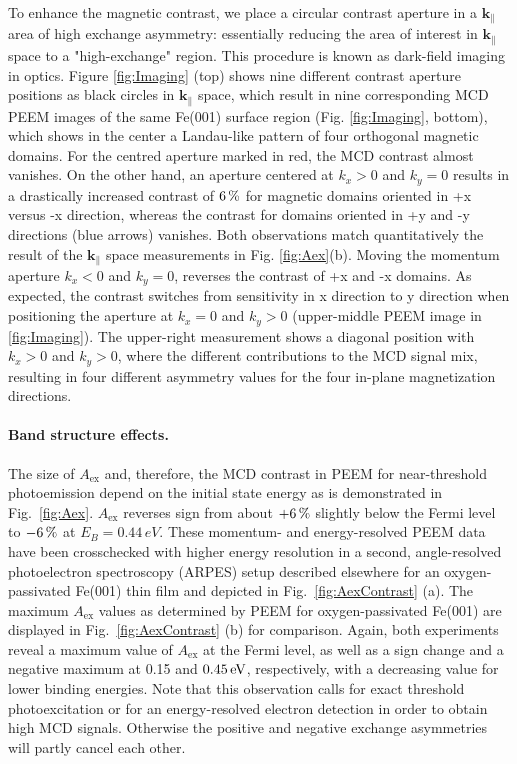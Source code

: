 \documentclass[prl,twocolumn,floatfix]{revtex4-2}
\renewcommand{\vec}[1]{\boldsymbol{#1}}
\begin{document}
To enhance the magnetic contrast, we place a circular contrast aperture in a $\vec{k}_{\parallel}$ area of high exchange asymmetry: essentially reducing the area of interest in $\vec{k}_{\parallel}$ space to a "high-exchange" region. This procedure is known as dark-field imaging in optics. 
Figure \ref{fig:Imaging} (top) shows nine different contrast aperture positions as black circles in $\vec{k}_{\parallel}$ space, which result in nine corresponding MCD PEEM images of the same Fe(001) surface region (Fig. \ref{fig:Imaging}, bottom), which shows in the center a Landau-like pattern of four orthogonal magnetic domains. For the centred aperture marked in red, the MCD contrast almost vanishes. On the other hand, an aperture centered at $k_x > 0$ and $k_y=0$ results in a drastically increased contrast of $\unit[6]{\%}$ for magnetic domains oriented in +x versus -x direction, whereas the contrast for domains oriented in +y and -y directions (blue arrows) vanishes. Both observations match quantitatively the result of the $\vec{k}_{\parallel}$ space measurements in Fig. \ref{fig:Aex}(b). Moving the momentum aperture $k_x < 0$ and $k_y=0$, reverses the contrast of +x and -x domains. 
As expected, the contrast switches from sensitivity in x direction to y direction when positioning the aperture at $k_x = 0$ and $k_y > 0$ (upper-middle PEEM image in \ref{fig:Imaging}). The upper-right measurement shows a diagonal position with $k_x > 0$ and $k_y > 0$, where the different contributions to the MCD signal mix, resulting in four different asymmetry values for the four in-plane magnetization directions. 

\paragraph{Band structure effects.}
The size of $A_{\mathrm{ex}}$ and, therefore, the MCD contrast in PEEM for near-threshold photoemission depend on the initial state energy as is demonstrated in Fig.~\ref{fig:Aex}. $A_{\mathrm{ex}}$ reverses sign from about $\unit[+6]{\%}$ slightly below the Fermi level to $\unit[-6]{\%}$ at $E_B= 0.44\,eV$. 
These momentum- and energy-resolved PEEM data have been crosschecked with higher energy resolution in a second, angle-resolved photoelectron spectroscopy (ARPES) setup described elsewhere \cite{gillmeister2018, gillmeister2020} for an oxygen-passivated Fe(001) thin film and depicted in Fig.~\ref{fig:AexContrast} (a). The maximum $A_{\mathrm{ex}}$ values as determined by PEEM for oxygen-passivated Fe(001) are displayed in Fig.~\ref{fig:AexContrast} (b) for comparison. Again, both experiments reveal a maximum value of $A_{\mathrm{ex}}$ at the Fermi level, as well as a sign change and a negative maximum at 0.15 and $\unit[0.45]{eV}$, respectively, with a decreasing value for lower binding energies. Note that this observation calls for exact threshold photoexcitation or for an energy-resolved electron detection in order to obtain high MCD signals. Otherwise the positive and negative exchange asymmetries will partly cancel each other.
\end{document}
